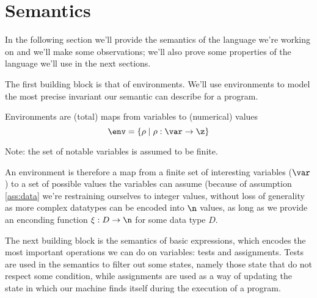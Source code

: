 \section{Semantics}

In the following section we'll provide the semantics of the language
we're working on and we'll make some observations; we'll also prove
some properties of the language we'll use in the next sections.

The first building block is that of environments. We'll use
environments to model the most precise invariant our semantic can
describe for a program.

\begin{definition}[Environments]
  Environments are (total) maps from variables to (numerical)
  values \[\env = \{\rho \mid \rho : \var \to \z\}\]

  Note: the set of notable variables is assumed to be finite.
\end{definition}

An environment is therefore a map from a finite set of interesting
variables (\(\var\)) to a set of possible values the variables can
assume (because of assumption \ref{ass:data} we're restraining
ourselves to integer values, without loss of generality as more complex
datatypes can be encoded into \(\n\) values, as long as we provide an
enconding function \(\xi : D \to \n\) for some data type \(D\).

The next building block is the semantics of basic expressions, which
encodes the most important operations we can do on variables: tests
and assignments. Tests are used in the semantics to filter out some
states, namely those state that do not respect some condition, while
assignments are used as a way of updating the state in which our
machine finds itself during the execution of a program.

